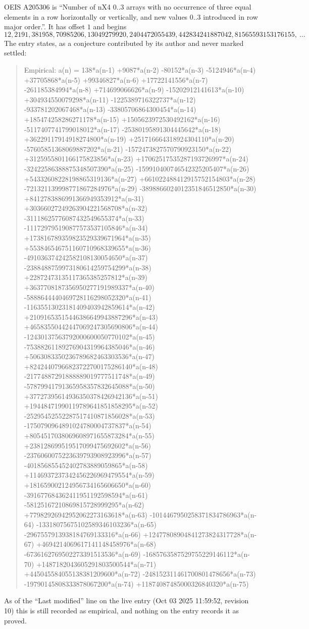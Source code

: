 \documentclass[11pt,a4paper]{article}
\theoremstyle{plain}
\theoremstyle{definition}
\begin{document}
OEIS A205306 is ``Number of nX4 0..3 arrays with no occurrence of three equal elements in a row horizontally or vertically, and new values 0..3 introduced in row major order.''. It has offset $1$ and begins
\[
12, 2191, 381958, 70985206, 13049279920, 2404472055439, 442834241887042, 81565593153176155,\ \dots
\]
The entry states, as a conjecture contributed by its author and never marked settled:
\begin{quote}
Empirical: a(n) = 138*a(n-1) +9087*a(n-2) -80152*a(n-3) -5124946*a(n-4) +37705868*a(n-5) +99346827*a(n-6) +17722141556*a(n-7) -261185384994*a(n-8) +714699066626*a(n-9) -15202912141613*a(n-10) +304934550079298*a(n-11) -1225389716322737*a(n-12) -933781202067468*a(n-13) -33805706864300454*a(n-14) +185474258286271178*a(n-15) +1505623972530492162*a(n-16) -5117407741799018012*a(n-17) -25380195891304445642*a(n-18) +36229117914918274800*a(n-19) +251716664318924304110*a(n-20) -57605851368069887202*a(n-21) -1572473827570790923150*a(n-22) +3125955801166175823856*a(n-23) +17062517535287193726997*a(n-24) -32422586388875348507390*a(n-25) -159910400746542325205407*a(n-26) +54332608228198865319136*a(n-27) +661022488412915752154803*a(n-28) -721321139998771867284976*a(n-29) -3898866024012351846512850*a(n-30) +8412783886991366949353912*a(n-31) +30366027249263904221568708*a(n-32) -31118625776087432549655374*a(n-33) -111729795190877573537105846*a(n-34) +173816789359823529339671964*a(n-35) +553846546751160710968339655*a(n-36) -491036374242582108130054650*a(n-37) -2388488759973180614259754299*a(n-38) +22872473135117365385257812*a(n-39) +3637708187356950277191989337*a(n-40) -5888644440469728116298052320*a(n-41) -11635513023181409403942859614*a(n-42) +21091653515446386649943887296*a(n-43) +46583550442447069247305690806*a(n-44) -12430137563792000600050770102*a(n-45) -75388261189276904319964385046*a(n-46) +5063083350236789682463303536*a(n-47) +82424407966823722700175286140*a(n-48) -21774887291888889019777511748*a(n-49) -57879941791365958357832645088*a(n-50) +37727395614936350378426942136*a(n-51) +19448471990119789641851858295*a(n-52) -25295452552287517410871856028*a(n-53) -1750790964891024780004737837*a(n-54) +8054517038069608971655873284*a(n-55) +238128699519517099475692602*a(n-56) -2376060075223639793908923996*a(n-57) -401856855452402783889059865*a(n-58) +1146937237342456226969479554*a(n-59) +181659002124956734165606650*a(n-60) -391677684362411951192598594*a(n-61) -58125167210869815728999295*a(n-62) +77982926942952062273163618*a(n-63) -1014467950258371834786963*a(n-64) -13318075675102589346103236*a(n-65) -2967557913938184769133316*a(n-66) +12477808904841273824317728*a(n-67) +4694214069617141148458976*a(n-68) -6736162769502273391513536*a(n-69) -1685763587529755229146112*a(n-70) +1487182043605291803500544*a(n-71) +445045584055138381209600*a(n-72) -248152311461700801478656*a(n-73) -19790145808333878067200*a(n-74) +11874087485000326840320*a(n-75)
\end{quote}
As of the ``Last modified'' line on the live entry (Oct 03 2025 11:59:52, revision 10) this is still
recorded as empirical, and nothing on the entry records it as proved.
\end{document}
